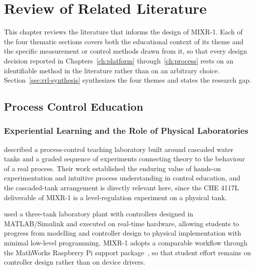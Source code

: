 
\chapter{Review of Related Literature}
\label{ch:rrl}

\ifpdf
    \graphicspath{{Chapter2/Figs/Raster/}{Chapter2/Figs/PDF/}{Chapter2/Figs/}}
\else
    \graphicspath{{Chapter2/Figs/Vector/}{Chapter2/Figs/}}
\fi

This chapter reviews the literature that informs the design of MIXR-1. Each of the four thematic sections covers both the educational context of its theme and the specific measurement or control methods drawn from it, so that every design decision reported in Chapters~\ref{ch:platform} through~\ref{ch:process} rests on an identifiable method in the literature rather than on an arbitrary choice. Section~\ref{sec:rrl-synthesis} synthesizes the four themes and states the research gap.


\section{Process Control Education}
\label{sec:rrl-education}

\subsection{Experiential Learning and the Role of Physical Laboratories}
\label{subsec:rrl-experiential}

\citet{astrom1985} described a process-control teaching laboratory built around cascaded water tanks and a graded sequence of experiments connecting theory to the behaviour of a real process. Their work established the enduring value of hands-on experimentation and intuitive process understanding in control education, and the cascaded-tank arrangement is directly relevant here, since the CHE 4117L deliverable of MIXR-1 is a level-regulation experiment on a physical tank.

\citet{saco2002} used a three-tank laboratory plant with controllers designed in MATLAB/Simulink and executed on real-time hardware, allowing students to progress from modelling and controller design to physical implementation with minimal low-level programming. MIXR-1 adopts a comparable workflow through the MathWorks Raspberry Pi support package~\citep{mathworks2026}, so that student effort remains on controller design rather than on device drivers.

